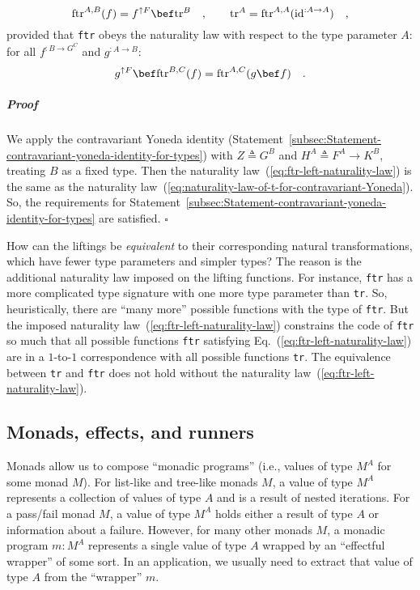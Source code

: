 ~\vspace{-0.6\baselineskip}
\begin{equation}
\text{ftr}^{A,B}(f)=f^{\uparrow F}\bef\text{tr}^{B}\quad,\quad\quad\text{tr}^{A}=\text{ftr}^{A,A}(\text{id}^{:A\rightarrow A})\quad,\label{eq:define-tr-via-ftr}
\end{equation}
provided that \lstinline!ftr! obeys the naturality law with respect
to the type parameter $A$: for all $f^{:B\rightarrow G^{C}}$ and
$g^{:A\rightarrow B}$:
\begin{equation}
g^{\uparrow F}\bef\text{ftr}^{B,C}(f)=\text{ftr}^{A,C}(g\bef f)\quad.\label{eq:ftr-left-naturality-law}
\end{equation}


\subparagraph{Proof}

We apply the contravariant Yoneda identity (Statement~\ref{subsec:Statement-contravariant-yoneda-identity-for-types})
with $Z\triangleq G^{B}$ and $H^{A}\triangleq F^{A}\rightarrow K^{B}$,
treating $B$ as a fixed type. Then the naturality law~(\ref{eq:ftr-left-naturality-law})
is the same as the naturality law~(\ref{eq:naturality-law-of-t-for-contravariant-Yoneda}).
So, the requirements for Statement~\ref{subsec:Statement-contravariant-yoneda-identity-for-types}
are satisfied. $\square$

How can the liftings be \emph{equivalent} to their corresponding natural
transformations, which have fewer type parameters and simpler types?
The reason is the additional naturality law imposed on the lifting
functions. For instance, \lstinline!ftr! has a more complicated type
signature with one more type parameter than \lstinline!tr!. So, heuristically,
there are \textsf{``}many more\textsf{''} possible functions with the type of \lstinline!ftr!.
But the imposed naturality law~(\ref{eq:ftr-left-naturality-law})
constrains the code of \lstinline!ftr! so much that all possible
functions \lstinline!ftr! satisfying Eq.~(\ref{eq:ftr-left-naturality-law})
are in a $1$-to-$1$ correspondence with all possible functions \lstinline!tr!.
The equivalence between \lstinline!tr! and \lstinline!ftr! does
not hold without the naturality law~(\ref{eq:ftr-left-naturality-law}). 

\subsection{Monads, effects, and runners}

Monads allow us to compose \textsf{``}monadic programs\textsf{''}
(i.e., values of type $M^{A}$ for some monad $M$). For list-like
and tree-like monads $M$, a value of type $M^{A}$ represents a collection
of values of type $A$ and is a result of nested iterations. For a
pass/fail monad $M$, a value of type $M^{A}$ holds either a result
of type $A$ or information about a failure. However, for many other
monads $M$, a monadic program $m:M^{A}$ represents a single value
of type $A$ wrapped by an \textsf{``}effectful wrapper\textsf{''} of some sort. In
an application, we usually need to extract that value of type $A$
from the \textsf{``}wrapper\textsf{''} $m$.

